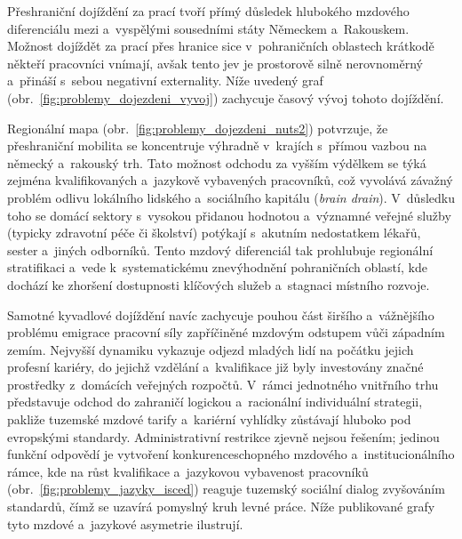 Přeshraniční dojíždění za prací tvoří přímý důsledek hlubokého mzdového diferenciálu mezi  a~vyspělými sousedními státy Německem a~Rakouskem. Možnost dojíždět za prací přes hranice sice v~pohraničních oblastech krátkodě někteří pracovníci vnímají, avšak tento jev je prostorově silně nerovnoměrný a~přináší s~sebou negativní externality. Níže uvedený graf (obr.~\ref{fig:problemy_dojezdeni_vyvoj}) zachycuje časový vývoj tohoto dojíždění.\par



Regionální mapa (obr.~\ref{fig:problemy_dojezdeni_nuts2}) potvrzuje, že přeshraniční mobilita se koncentruje výhradně v~krajích s~přímou vazbou na německý a~rakouský trh. Tato možnost odchodu za vyšším výdělkem se týká zejména kvalifikovaných a~jazykově vybavených pracovníků, což vyvolává závažný problém odlivu lokálního lidského a~sociálního kapitálu (\textit{brain drain}). V~důsledku toho se domácí sektory s~vysokou přidanou hodnotou a~významné veřejné služby (typicky zdravotní péče či školství) potýkají s~akutním nedostatkem lékařů, sester a~jiných odborníků. Tento mzdový diferenciál tak prohlubuje regionální stratifikaci a~vede k~systematickému znevýhodnění pohraničních oblastí, kde dochází ke zhoršení dostupnosti klíčových služeb a~stagnaci místního rozvoje.\par



Samotné kyvadlové dojíždění navíc zachycuje pouhou část širšího a~vážnějšího problému emigrace pracovní síly zapříčiněné mzdovým odstupem  vůči západním zemím. Nejvyšší dynamiku vykazuje odjezd mladých lidí na počátku jejich profesní kariéry, do jejichž vzdělání a~kvalifikace již byly investovány značné prostředky z~domácích veřejných rozpočtů. V~rámci jednotného vnitřního trhu  představuje odchod do zahraničí logickou a~racionální individuální strategii, pakliže tuzemské mzdové tarify a~kariérní vyhlídky zůstávají hluboko pod evropskými standardy. Administrativní restrikce zjevně nejsou řešením; jedinou funkční odpovědí je vytvoření konkurenceschopného mzdového a~institucionálního rámce, kde na růst kvalifikace a~jazykovou vybavenost pracovníků (obr.~\ref{fig:problemy_jazyky_isced}) reaguje tuzemský sociální dialog zvyšováním standardů, čímž se uzavírá pomyslný kruh levné práce. Níže publikované grafy tyto mzdové a~jazykové asymetrie ilustrují.\par


